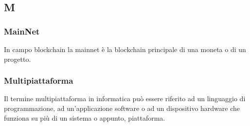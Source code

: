 \subsection*{\textbf{\hfill \Huge{M} \hfill}} 
\subsubsection*{MainNet}
In campo blockchain la mainnet è la blockchain principale di una moneta o di un progetto.
\subsubsection*{Multipiattaforma}
Il termine multipiattaforma in informatica può essere riferito ad un linguaggio di programmazione, ad un'applicazione software o ad un dispositivo hardware che funziona su più di un sistema o appunto, piattaforma.
